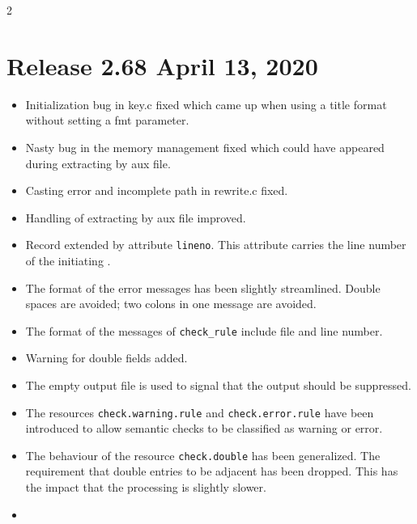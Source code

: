 \documentclass[11pt,a4paper]{scrartcl}
\newcommand\rsc[1]{\texttt{#1}}
\newcommand\File[1]{\textsf{#1}}
\newenvironment{Releases}{\begin{multicols}2\RaggedRight}{\end{multicols}}
\newenvironment{Release}[2]{%
  \def\tmp{#2}%
  \section*{Release #1 \ifx\tmp\empty\else{\normalsize[#2]}\fi}
  \begin{itemize}
}{\end{itemize}}
\newenvironment{Fix}[1]{\item }{}
\newenvironment{New}[1]{\item }{}
\newenvironment{Update}[1]{\item }{}
\begin{document}
\begin{Releases}
 \begin{Release}{2.68}{April 13, 2020}
  \begin{Fix}{gene}
    Initialization bug in \File{key.c} fixed which came up when using a title
    format without setting a fmt parameter.
  \end{Fix}
  \begin{Fix}{gene}
    Nasty bug in the memory management fixed which could have appeared
    during extracting by aux file.
  \end{Fix}
  \begin{Fix}{gene}
    Casting error and incomplete path in \File{rewrite.c} fixed.
  \end{Fix}
  \begin{Update}{gene}
    Handling of extracting by aux file improved.
  \end{Update}
  \begin{New}{gene}
    Record extended by attribute \texttt{lineno}.
    This attribute carries the line number of the initiating \@.
  \end{New}
  \begin{Update}{gene}
    The format of the error messages has been slightly streamlined.
    Double spaces are avoided; two colons in one message are avoided.
  \end{Update}
  \begin{Update}{gene}
    The format of the messages of \verb|check_rule| include file and line
    number.
  \end{Update}
  \begin{New}{gene}
    Warning for double fields added.
  \end{New}
  \begin{New}{gene}
    The empty output file is used to signal that the output should be
    suppressed.
  \end{New}
  \begin{New}{gene}
    The resources \rsc{check.warning.rule} and \rsc{check.error.rule}
    have been introduced to allow semantic checks to be classified as
    warning or error.
  \end{New}
  \begin{New}{gene}
    The behaviour of the resource \rsc{check.double} has been
    generalized. The requirement that double entries to be adjacent
    has been dropped. This has the impact that the processing is
    slightly slower.
  \end{New}
  \begin{New}{gene}

\end{New}
\end{Release}
\end{Releases}
\end{document}
